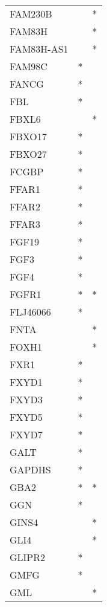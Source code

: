 \begin{longtable}{lcc}
FAM230B      &           &       * \\
FAM83H       &           &       * \\
FAM83H-AS1   &           &       * \\
FAM98C       &         * &         \\
FANCG        &         * &         \\
FBL          &         * &         \\
FBXL6        &           &       * \\
FBXO17       &         * &         \\
FBXO27       &         * &         \\
FCGBP        &         * &         \\
FFAR1        &         * &         \\
FFAR2        &         * &         \\
FFAR3        &         * &         \\
FGF19        &         * &         \\
FGF3         &         * &         \\
FGF4         &         * &         \\
FGFR1        &         * &       * \\
FLJ46066     &         * &         \\
FNTA         &           &       * \\
FOXH1        &           &       * \\
FXR1         &         * &         \\
FXYD1        &         * &         \\
FXYD3        &         * &         \\
FXYD5        &         * &         \\
FXYD7        &         * &         \\
GALT         &         * &         \\
GAPDHS       &         * &         \\
GBA2         &         * &       * \\
GGN          &         * &         \\
GINS4        &           &       * \\
GLI4         &           &       * \\
GLIPR2       &         * &         \\
GMFG         &         * &         \\
GML          &           &       * \\

\end{longtable}
